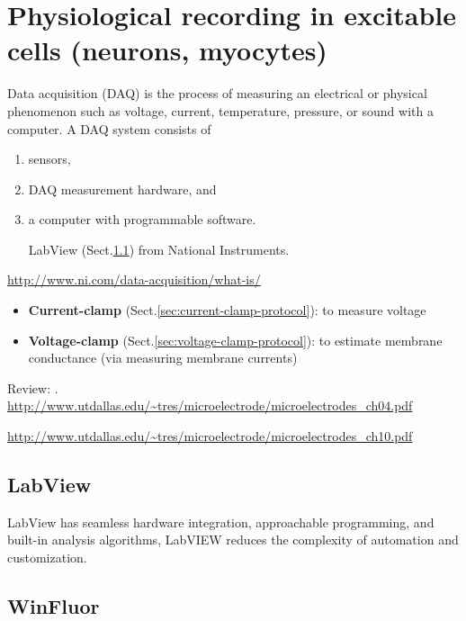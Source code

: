 \section{Physiological recording in excitable cells (neurons, myocytes)}

Data acquisition (DAQ) is the process of measuring an electrical or physical
phenomenon such as voltage, current, temperature, pressure, or sound with a computer.
A DAQ system consists of 
\begin{enumerate}
  \item  sensors, 
  
  \item DAQ measurement hardware, and 
  
  \item a computer with programmable software.
  
  LabView (Sect.\ref{sec:LabView}) from National Instruments.
  
\end{enumerate}
\url{http://www.ni.com/data-acquisition/what-is/}

\begin{itemize}
  \item {\bf Current-clamp } (Sect.\ref{sec:current-clamp-protocol}): to measure
  voltage

  \item {\bf Voltage-clamp } (Sect.\ref{sec:voltage-clamp-protocol}): to
  estimate membrane conductance (via measuring membrane currents)

\end{itemize}

Review: \citep{cummins2009, perkins2006}.
\url{http://www.utdallas.edu/~tres/microelectrode/microelectrodes_ch04.pdf}

\url{http://www.utdallas.edu/~tres/microelectrode/microelectrodes_ch10.pdf}

\subsection{LabView}
\label{sec:LabView}

LabView has seamless hardware integration, approachable programming, and
built-in analysis algorithms, LabVIEW reduces the complexity of automation and
customization.

\subsection{WinFluor}
\label{sec:WinFluor}

